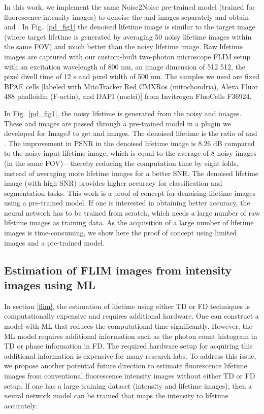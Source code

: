 \documentclass[12pt]{iopart}
\begin{document}
In this work, we implement the same Noise2Noise pre-trained model (trained for fluorescence intensity images) \cite{cvpr} to denoise the  and  images separately and obtain  and . In Fig.~\ref{pd_fig1} the denoised lifetime image is similar to the target image (where target lifetime is generated by averaging 50 noisy lifetime images within the same FOV) and much better than the noisy lifetime image. Raw lifetime images are captured with our custom-built two-photon microscope FLIM setup \cite{instant_flim} with an excitation wavelength of 800 nm, an image dimension of 512  512, the pixel dwell time of 12 s and pixel width of 500 nm. The samples we used are fixed BPAE cells [labeled with MitoTracker Red CMXRos (mitochondria), Alexa Fluor 488 phalloidin (F-actin), and DAPI (nuclei)] from Invitrogen FluoCells F36924. 

In Fig.~\ref{pd_fig1}, the noisy lifetime is generated from the noisy  and  images. These  and  images are passed through a pre-trained model in a plugin we developed for ImageJ \cite{Mannam:20} to get  and  images. The denoised lifetime is the ratio of  and . The improvement in PSNR in the denoised lifetime image is 8.26 dB compared to the noisy input lifetime image, which is equal to the average of 8 noisy images (in the same FOV)—thereby reducing the computation time by eight folds, instead of averaging more lifetime images for a better SNR. The denoised lifetime image (with high SNR) provides higher accuracy for classification and segmentation tasks. This work is a proof of concept for denoising lifetime images using a pre-trained model. If one is interested in obtaining better accuracy, the neural network has to be trained from scratch, which needs a large number of raw lifetime images as training data. As the acquisition of a large number of lifetime images is time-consuming, we show here the proof of concept using limited images and a pre-trained model.

\subsection{Estimation of FLIM images from intensity images using ML} \label{est_lifetime}
In section \ref{flim}, the estimation of lifetime using either TD or FD techniques is computationally expensive and requires additional hardware. One can construct a model with ML that reduces the computational time significantly. However, the ML model requires additional information such as the photon count histogram in TD or phase information in FD. The required hardware setup for acquiring this additional information is expensive for many research labs.
To address this issue, we propose another potential future direction to estimate fluorescence lifetime images from conventional fluorescence intensity images without either TD or FD setup. If one has a large training dataset (intensity and lifetime images), then a neural network model can be trained that maps the intensity to lifetime accurately.
\end{document}
